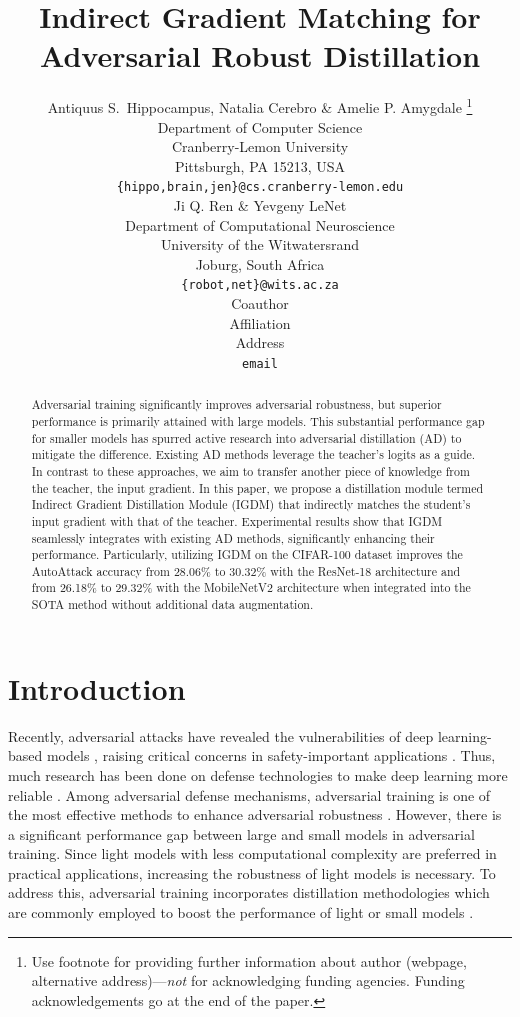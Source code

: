\documentclass{article} %
\title{Indirect Gradient Matching for Adversarial Robust Distillation}
\author{Antiquus S.~Hippocampus, Natalia Cerebro \& Amelie P. Amygdale \thanks{ Use footnote for providing further information
about author (webpage, alternative address)---\emph{not} for acknowledging
funding agencies.  Funding acknowledgements go at the end of the paper.} \\
Department of Computer Science\\
Cranberry-Lemon University\\
Pittsburgh, PA 15213, USA \\
\texttt{\{hippo,brain,jen\}@cs.cranberry-lemon.edu} \\
\And
Ji Q. Ren \& Yevgeny LeNet \\
Department of Computational Neuroscience \\
University of the Witwatersrand \\
Joburg, South Africa \\
\texttt{\{robot,net\}@wits.ac.za} \\
\AND
Coauthor \\
Affiliation \\
Address \\
\texttt{email}
}
\begin{document}
\maketitle

\begin{abstract}
Adversarial training significantly improves adversarial robustness, but superior performance is primarily attained with large models. 
This substantial performance gap for smaller models has spurred active research into adversarial distillation (AD) to mitigate the difference. 
Existing AD methods leverage the teacher’s logits as a guide.
In contrast to these approaches, we aim to transfer another piece of knowledge from the teacher, the input gradient.
In this paper, we propose a distillation module termed Indirect Gradient Distillation Module (IGDM) that indirectly matches the student’s input gradient with that of the teacher.
Experimental results show that IGDM seamlessly integrates with existing AD methods, significantly enhancing their performance.
Particularly, utilizing IGDM on the CIFAR-100 dataset improves the AutoAttack accuracy from 28.06\% to 30.32\% with the ResNet-18 architecture and from 26.18\% to 29.32\% with the MobileNetV2 architecture when integrated into the SOTA method without additional data augmentation.
\end{abstract}

\section{Introduction}
\label{sec:intro}

Recently, adversarial attacks have revealed the vulnerabilities of deep learning-based models \citep{FGSM, CW_attack, PGD}, raising critical concerns in safety-important applications \citep{safe2, safe1,wang2023does}.
Thus, much research has been done on defense technologies to make deep learning more reliable \citep{2017_jpeg_defense, carmon2019unlabeled, cohen2019certified, xie2019feature, zhang2022adversarial, jin2023randomized}.
Among adversarial defense mechanisms, adversarial training is one of the most effective methods to enhance adversarial robustness \citep{pang2020bag, bai2021recent, wei2023cfa}.
However, there is a significant performance gap between large and small models in adversarial training.
Since light models with less computational complexity are preferred in practical applications, increasing the robustness of light models is necessary.
To address this, adversarial training incorporates distillation methodologies which are commonly employed to boost the performance of light or small models \citep{ard,iad, rslad,adaad}.
\end{document}
